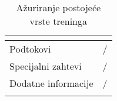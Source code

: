\documentclass[../main.tex]{subfiles}
\begin{document}
\begin{longtable}{| p{} | p{} |}
\begin{itemize}
    \end{itemize}\\
\hline
    Podtokovi & /\\
\hline
    Specijalni zahtevi & /\\
\hline
    Dodatne informacije & /\\
\hline
\caption{Ažuriranje postojeće vrste treninga} %
\end{longtable}
\end{document}
